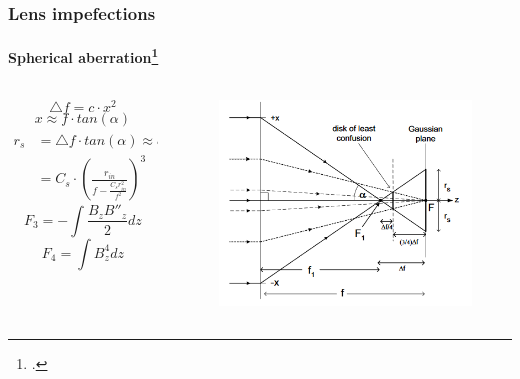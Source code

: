 \documentclass[10pt]{beamer}
\newcommand{\rfn}{\setcounter{footnote}{0}}
\begin{document}
\begin{frame}
  \frametitle{Lens impefections}
  \framesubtitle{Spherical aberration\footcite{Egerton}}
  \rfn
  \begin{columns}
    \begin{column}{0.4\textwidth}
      \begin{tiny}
      \begin{equation}
        \triangle f=c\cdotp x^{2}
      \end{equation}
      \begin{equation}
        x\approx f\cdotp tan\left(\alpha\right)
      \end{equation}
      \begin{align}
        r_{s}&=\triangle f\cdotp tan\left(\alpha\right)\approx c\cdotp f^{2}tan\left(\alpha\right)^{3}\\
        &=C_{s}\cdotp\left(\frac{r_{in}}{f-\frac{C_{s}r_{in}^{2}}{f^{2}}}\right)^{3}
      \end{align}
      \begin{equation}
        F_{3}=-\int\frac{B_{z}B''_{z}}{2}dz
      \end{equation}
      \begin{equation}
        F_{4}=\int B_{z}^{4}dz
      \end{equation}
      \end{tiny}
    \end{column}
    \begin{column}{0.6\textwidth}
    \begin{figure}[R]
      \includegraphics[width=\textwidth]{Spher_Abb1.png}

\end{figure}
\end{column}
\end{columns}
\end{frame}
\end{document}

